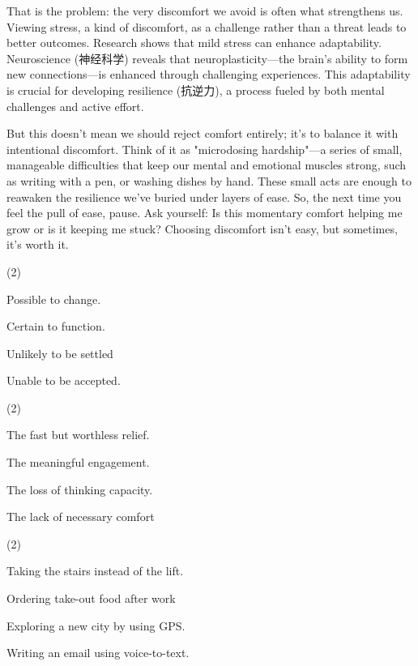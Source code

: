 \documentclass{英语试卷}
\begin{document}
\par That is the problem: the very discomfort we avoid is often what strengthens us. Viewing stress, a kind of discomfort, as a challenge rather than a threat leads to better outcomes. Research shows that mild stress can enhance adaptability. Neuroscience (神经科学) reveals that neuroplasticity—the brain's ability to form new connections—is enhanced through challenging experiences. This adaptability is crucial for developing resilience (抗逆力), a process fueled by both mental challenges and active effort.\par
\par But this doesn't mean we should reject comfort entirely; it's to balance it with intentional discomfort. Think of it as "microdosing hardship"—a series of small, manageable difficulties that keep our mental and emotional muscles strong, such as writing with a pen, or washing dishes by hand. These small acts are enough to reawaken the resilience we've buried under layers of ease. So, the next time you feel the pull of ease, pause. Ask yourself: Is this momentary comfort helping me grow or is it keeping me stuck? Choosing discomfort isn't easy, but sometimes, it's worth it.\par
{}
\begin{choices}(2)
  \item Possible to change.
  \item Certain to function.
  \item Unlikely to be settled
  \item Unable to be accepted.
\end{choices}
\begin{choices}(2)
  \item The fast but worthless relief.
  \item The meaningful engagement.
  \item The loss of thinking capacity.
  \item The lack of necessary comfort
\end{choices}
\begin{choices}(2)
  \item Taking the stairs instead of the lift.
  \item Ordering take-out food after work
  \item Exploring a new city by using GPS.
  \item Writing an email using voice-to-text.
\end{choices}
\end{document}

